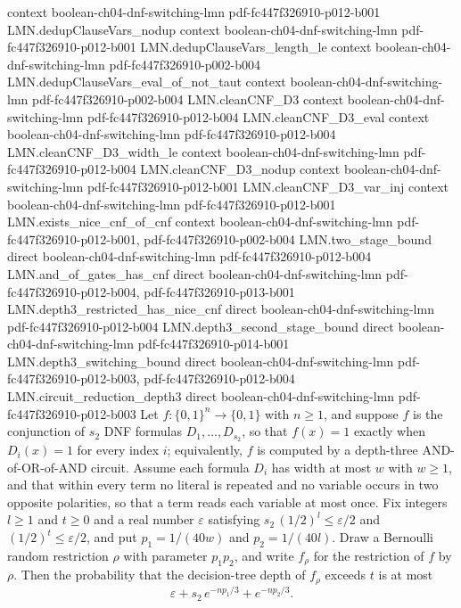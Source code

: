 \begin{theorem}
  {context}
  {boolean-ch04-dnf-switching-lmn}
  {pdf-fc447f326910-p012-b001}
\proofstep
  {LMN.dedupClauseVars_nodup}
  {context}
  {boolean-ch04-dnf-switching-lmn}
  {pdf-fc447f326910-p012-b001}
\proofstep
  {LMN.dedupClauseVars_length_le}
  {context}
  {boolean-ch04-dnf-switching-lmn}
  {pdf-fc447f326910-p002-b004}
\proofstep
  {LMN.dedupClauseVars_eval_of_not_taut}
  {context}
  {boolean-ch04-dnf-switching-lmn}
  {pdf-fc447f326910-p002-b004}
\proofstep
  {LMN.cleanCNF_D3}
  {context}
  {boolean-ch04-dnf-switching-lmn}
  {pdf-fc447f326910-p012-b004}
\proofstep
  {LMN.cleanCNF_D3_eval}
  {context}
  {boolean-ch04-dnf-switching-lmn}
  {pdf-fc447f326910-p012-b004}
\proofstep
  {LMN.cleanCNF_D3_width_le}
  {context}
  {boolean-ch04-dnf-switching-lmn}
  {pdf-fc447f326910-p012-b004}
\proofstep
  {LMN.cleanCNF_D3_nodup}
  {context}
  {boolean-ch04-dnf-switching-lmn}
  {pdf-fc447f326910-p012-b001}
\proofstep
  {LMN.cleanCNF_D3_var_inj}
  {context}
  {boolean-ch04-dnf-switching-lmn}
  {pdf-fc447f326910-p012-b001}
\proofstep
  {LMN.exists_nice_cnf_of_cnf}
  {context}
  {boolean-ch04-dnf-switching-lmn}
  {pdf-fc447f326910-p012-b001,
    pdf-fc447f326910-p002-b004}
\proofstep
  {LMN.two_stage_bound}
  {direct}
  {boolean-ch04-dnf-switching-lmn}
  {pdf-fc447f326910-p012-b004}
\proofstep
  {LMN.and_of_gates_has_cnf}
  {direct}
  {boolean-ch04-dnf-switching-lmn}
  {pdf-fc447f326910-p012-b004,
    pdf-fc447f326910-p013-b001}
\proofstep
  {LMN.depth3_restricted_has_nice_cnf}
  {direct}
  {boolean-ch04-dnf-switching-lmn}
  {pdf-fc447f326910-p012-b004}
\proofstep
  {LMN.depth3_second_stage_bound}
  {direct}
  {boolean-ch04-dnf-switching-lmn}
  {pdf-fc447f326910-p014-b001}
\proofstep
  {LMN.depth3_switching_bound}
  {direct}
  {boolean-ch04-dnf-switching-lmn}
  {pdf-fc447f326910-p012-b003,
    pdf-fc447f326910-p012-b004}
\proofstep
  {LMN.circuit_reduction_depth3}
  {direct}
  {boolean-ch04-dnf-switching-lmn}
  {pdf-fc447f326910-p012-b003}
Let $f:\{0,1\}^n\to\{0,1\}$ with $n\ge 1$, and suppose $f$ is the conjunction of $s_2$
DNF formulas $D_1,\dots,D_{s_2}$, so that $f(x)=1$ exactly when $D_i(x)=1$ for every
index $i$; equivalently, $f$ is computed by a depth-three AND-of-OR-of-AND circuit.
Assume each formula $D_i$ has width at most $w$ with $w\ge 1$, and that within every
term no literal is repeated and no variable occurs in two opposite polarities, so that a
term reads each variable at most once. Fix integers $l\ge 1$ and $t\ge 0$ and a real
number $\varepsilon$ satisfying $s_2\,(1/2)^{l}\le \varepsilon/2$ and
$(1/2)^{t}\le\varepsilon/2$, and put $p_1=1/(40w)$ and $p_2=1/(40l)$. Draw a Bernoulli
random restriction $\rho$ with parameter $p_1 p_2$, and write $f_\rho$ for the
restriction of $f$ by $\rho$. Then the probability that the decision-tree depth of
$f_\rho$ exceeds $t$ is at most
\[
\varepsilon+s_2\,e^{-np_1/3}+e^{-np_2/3}.
\]
\end{theorem}

